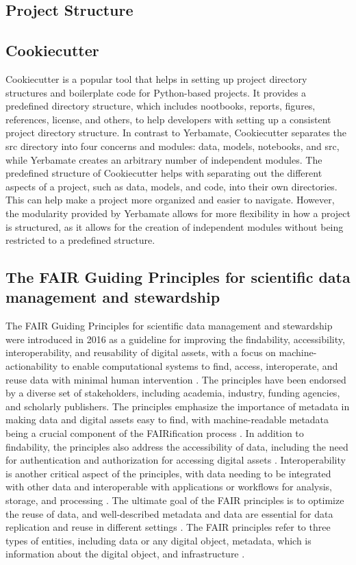 \subsection{Project Structure}

\subsection{Cookiecutter}
Cookiecutter is a popular tool that helps in setting up project directory structures and boilerplate code for Python-based projects. It provides a predefined directory structure, which includes nootbooks, reports, figures, references, license, and others, to help developers with setting up a consistent project directory structure. In contrast to Yerbamate, Cookiecutter separates the src directory into four concerns and modules: data, models, notebooks, and src, while Yerbamate creates an arbitrary number of independent modules. The predefined structure of Cookiecutter helps with separating out the different aspects of a project, such as data, models, and code, into their own directories. This can help make a project more organized and easier to navigate. However, the modularity provided by Yerbamate allows for more flexibility in how a project is structured, as it allows for the creation of independent modules without being restricted to a predefined structure.


\subsection{The FAIR Guiding Principles for scientific data management and stewardship }
The FAIR Guiding Principles for scientific data management and stewardship were introduced in 2016 as a guideline for improving the findability, accessibility, interoperability, and reusability of digital assets, with a focus on machine-actionability to enable computational systems to find, access, interoperate, and reuse data with minimal human intervention \cite{wilkinson2016fair}. The principles have been endorsed by a diverse set of stakeholders, including academia, industry, funding agencies, and scholarly publishers. The principles emphasize the importance of metadata in making data and digital assets easy to find, with machine-readable metadata being a crucial component of the FAIRification process \cite{wilkinson2016fair}. In addition to findability, the principles also address the accessibility of data, including the need for authentication and authorization for accessing digital assets \cite{wilkinson2016fair}. Interoperability is another critical aspect of the principles, with data needing to be integrated with other data and interoperable with applications or workflows for analysis, storage, and processing \cite{wilkinson2016fair}. The ultimate goal of the FAIR principles is to optimize the reuse of data, and well-described metadata and data are essential for data replication and reuse in different settings \cite{wilkinson2016fair}. The FAIR principles refer to three types of entities, including data or any digital object, metadata, which is information about the digital object, and infrastructure \cite{wilkinson2016fair}.
